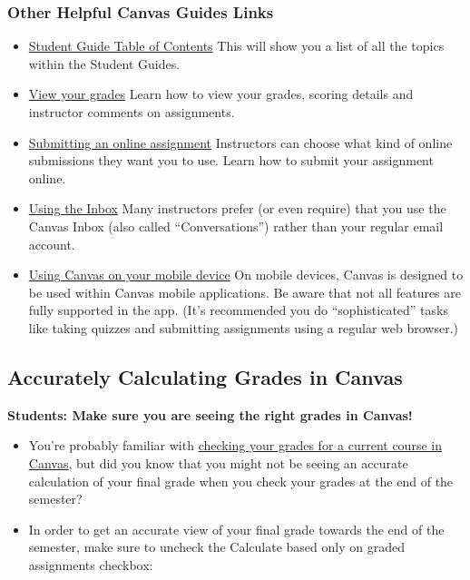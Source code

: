\hypertarget{other-helpful-canvas-guides-links}{%
\subsubsection{Other Helpful Canvas Guides Links}\label{other-helpful-canvas-guides-links}}

\begin{itemize}
\item
  \href{https://community.canvaslms.com/t5/Student-Guide/tkb-p/student}{Student Guide Table of Contents}
  This will show you a list of all the topics within the Student Guides.
\item
  \href{https://community.canvaslms.com/t5/Student-Guide/How-do-I-view-my-grades-in-a-current-course/ta-p/493}{View your grades}
  Learn how to view your grades, scoring details and instructor comments on assignments.
\item
  \href{https://community.canvaslms.com/t5/Student-Guide/How-do-I-submit-an-online-assignment/ta-p/503}{Submitting an online assignment}
  Instructors can choose what kind of online submissions they want you to use. Learn how to submit your assignment online.
\item
  \href{https://community.canvaslms.com/t5/Student-Guide/How-do-I-use-the-Inbox-as-a-student/ta-p/532}{Using the Inbox}
  Many instructors prefer (or even require) that you use the Canvas Inbox (also called ``Conversations'') rather than your regular email account.
\item
  \href{https://community.canvaslms.com/t5/Student-Guide/How-can-I-use-Canvas-on-my-mobile-device-as-a-student/ta-p/282}{Using Canvas on your mobile device}
  On mobile devices, Canvas is designed to be used within Canvas mobile applications. Be aware that not all features are fully supported in the app. (It's recommended you do ``sophisticated'' tasks like taking quizzes and submitting assignments using a regular web browser.)
\end{itemize}

\hypertarget{accurately-calculating-grades-in-canvas}{%
\subsection{Accurately Calculating Grades in Canvas}\label{accurately-calculating-grades-in-canvas}}

\textbf{Students: Make sure you are seeing the right grades in Canvas!}

\begin{itemize}
\item
  You're probably familiar with \href{https://community.canvaslms.com/t5/Student-Guide/How-do-I-view-my-grades-in-a-current-course/ta-p/493}{checking your grades for a current course in Canvas}, but did you know that you might not be seeing an accurate calculation of your final grade when you check your grades at the end of the semester?
\item
  In order to get an accurate view of your final grade towards the end of the semester, make sure to uncheck the Calculate based only on graded assignments checkbox:
\end{itemize}

